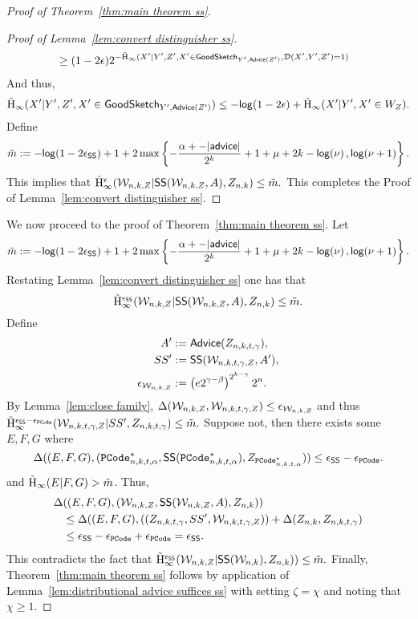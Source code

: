 \begin{proof}[Proof of Theorem~\ref{thm:main theorem ss}]
\begin{proof}[Proof of Lemma~\ref{lem:convert distinguisher ss}]
\begin{align*}
 &\ge  (1-2\epsilon)2^{-\tilde{\mathrm{H}}_\infty(X'|Y',Z', X'\in\mathsf{GoodSketch}_{Y', {\mathsf{Advice}}(Z')},  \mathcal{D}(X', Y', Z')=1) }
\end{align*}
And thus, 
\[
\tilde{\mathrm{H}}_\infty(X'|Y', Z', X'\in\mathsf{GoodSketch}_{Y', {\mathsf{Advice}}(Z')}) \le  -\mathsf{log}\!\left(1-2\epsilon\right) +\tilde{\mathrm{H}}_\infty(X'|Y', X'\in W_Z).
\]
Define \[\tilde{m}:= -\mathsf{log}\!\left(1-2\epsilon_{\mathsf{SS}}\right) +1 + 2\max\left\{-\frac{\alpha+-|{\mathsf{advice}}|}{2^k}+1+\mu+2k-\mathsf{log}\!\left(\nu\right), \mathsf{log}\!\left(\nu+1\right)\right\}.\]
This implies that 
$
\tilde{\mathrm{H}}_\infty^\epsilon(\mathcal{W}_{n,k, Z}| {\mathsf{SS}}(\mathcal{W}_{n,k, Z}, A), Z_{n,k}) \le \tilde{m}.
$
This completes the Proof of Lemma~\ref{lem:convert distinguisher ss}.
\end{proof}

\noindent
We now proceed to the proof of Theorem~\ref{thm:main theorem ss}.   Let \[\tilde{m}:= -\mathsf{log}\!\left(1-2\epsilon_{\mathsf{SS}}\right) +1 + 2\max\left\{-\frac{\alpha+-|{\mathsf{advice}}|}{2^k}+1+\mu+2k-\mathsf{log}\!\left(\nu\right), \mathsf{log}\!\left(\nu+1\right)\right\}.\]  Restating Lemma~\ref{lem:convert distinguisher ss} one has that 
\[
\tilde{\mathrm{H}}_\infty^{\epsilon_{\mathsf{SS}}}(\mathcal{W}_{n,k, Z} |  {\mathsf{SS}}(\mathcal{W}_{n,k, Z}, A), Z_{n,k}) \le \tilde{m}.
\]
Define \begin{align*}A'&:={\mathsf{Advice}}(Z_{n,k,t,\gamma}),\\
SS'&:={\mathsf{SS}}(\mathcal{W}_{n,k,t,\gamma, Z}, A'),\\
\epsilon_{\mathcal{W}_{n,k, Z}}&:= \left(e2^{\gamma-\beta}\right)^{2^{k-\gamma}}2^n.
\end{align*}
By Lemma~\ref{lem:close family}, $\Delta(\mathcal{W}_{n,k, Z}, \mathcal{W}_{n,k,t,\gamma, Z}) \le \epsilon_{\mathcal{W}_{n,k, Z}}$ and thus
$
\tilde{\mathrm{H}}_\infty^{\epsilon_{{\mathsf{SS}}}-\epsilon_{\mathtt{PCode}}}(\mathcal{W}_{n,k,t,\gamma, Z} | SS', Z_{n,k,t,\gamma})\le \tilde{m}.
$
Suppose not, then there exists some $E, F, G$ where 
\[
\Delta((E, F, G), (\mathtt{PCode}_{n, k, t, \alpha}^{*} , {\mathsf{SS}}(\mathtt{PCode}_{n, k, t, \alpha}^{*}), Z_{\mathtt{PCode}_{n, k, t, \alpha}^{*}}))\le \epsilon_{{\mathsf{SS}}}-\epsilon_{\mathtt{PCode}}.
\]
and $\tilde{\mathrm{H}}_\infty(E|F, G)>\tilde{m}$.
Thus, 
\begin{align*}
\Delta&((E, F, G), (\mathcal{W}_{n,k, Z} ,  {\mathsf{SS}}(\mathcal{W}_{n,k, Z}, A), Z_{n,k}))\\
&\le \Delta((E, F, G), ((Z_{n,k,t,\gamma} , SS', \mathcal{W}_{n,k,t,\gamma, Z}))+\Delta(Z_{n,k}, Z_{n,k,t,\gamma})\\
&\le \epsilon_{{\mathsf{SS}}}-\epsilon_{\mathtt{PCode}}+ \epsilon_{\mathtt{PCode}} = \epsilon_{{\mathsf{SS}}}.
\end{align*}
This contradicts the fact that $\tilde{\mathrm{H}}_\infty^{\epsilon_{\mathsf{SS}}}(\mathcal{W}_{n,k, Z} | {\mathsf{SS}}(\mathcal{W}_{n,k}), Z_{n,k})) \le \tilde{m}.$
Finally, Theorem~\ref{thm:main theorem ss} follows by application of Lemma~\ref{lem:distributional advice suffices ss} with setting $\zeta = \chi$ and noting that $\chi\ge 1$.

\end{proof}


